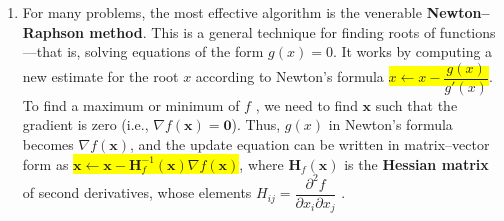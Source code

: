 \begin{enumerate}
    \item For many problems, the most effective algorithm is the venerable \textbf{Newton–Raphson method}. 
    This is a general technique for finding roots of functions—that is, solving equations of the form $g(x) = 0$. 
    It works by computing a new estimate for the root $x$ according to Newton’s formula \colorbox{yellow}{$x \gets x - \dfrac{g(x)}{g'(x)}$}.
    To find a maximum or minimum of $f$ , we need to find $\bm{x}$ such that the gradient is zero (i.e., $\nabla f (\bm{x}) = \bm{0}$). 
    Thus, $g(x)$ in Newton’s formula becomes $\nabla f (\bm{x})$, and the update equation can be written in matrix–vector form as \colorbox{yellow}{$\bm{x} \gets \bm{x} - \bm{H}_f^{-1}(\bm{x})\nabla f(\bm{x})$}, where $\bm{H}_f (\bm{x})$ is the \textbf{Hessian matrix} of second derivatives, whose elements $H_{ij} = \dfrac{ \partial ^2f}{ \partial x_i \partial x_j}$ . 
    \hfill \cite{ai/book/Artificial-Intelligence-A-Modern-Approach/Russell-Norvig}
\end{enumerate}








\clearpage


